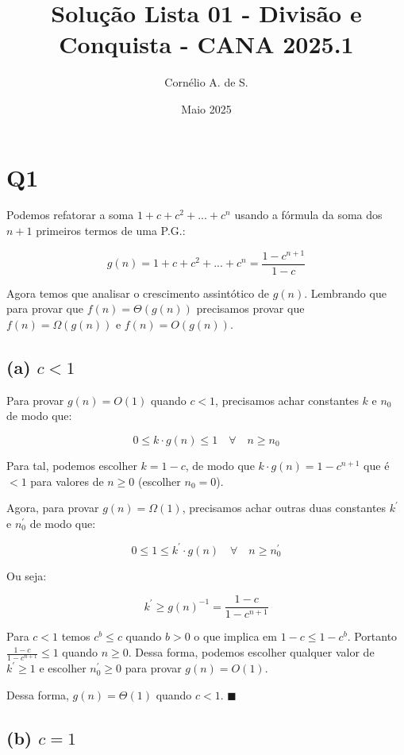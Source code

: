 \documentclass[12pt, a4paper]{article}
\title{Solução Lista 01 - Divisão e Conquista - CANA 2025.1}
\author{Cornélio A. de S.}
\date{Maio 2025}
\begin{document}
\maketitle




\section*{Q1}

Podemos refatorar a soma $1+c+c^2+...+c^n$ usando a fórmula da soma dos $n+1$ primeiros termos de uma P.G.:

\[ g(n) = 1+c+c^2+...+c^n = \frac{1-c^{n+1}}{1-c} \]

Agora temos que analisar o crescimento assintótico de $g(n)$. Lembrando que para provar que $f(n)=\Theta(g(n))$ precisamos provar que $f(n)=\Omega(g(n))$ e $f(n)=O(g(n))$.

\subsection*{(a) $c<1$}

Para provar $g(n) = O(1)$ quando $c<1$, precisamos achar constantes $k$ e $n_0$ de modo que:

\[ 0 \leq k \cdot g(n) \leq 1 \quad \forall \quad n \geq n_0 \]

Para tal, podemos escolher $k=1-c$, de modo que $k \cdot g(n) = 1-c^{n+1}$ que é $< 1$ para valores de $n \geq 0$ (escolher $n_0 = 0$).

Agora, para provar $g(n) = \Omega(1)$, precisamos achar outras duas constantes $k^{'}$ e $n^{'}_{0}$ de modo que:

\[ 0 \leq 1 \leq k^{'} \cdot g(n) \quad \forall \quad n \geq n^{'}_{0} \]

Ou seja:

\[ k^{'} \geq g(n)^{-1} = \frac{1-c}{1-c^{n+1}} \]

Para $c<1$ temos $c^b \leq c$ quando $b>0$ o que implica em $1-c \leq 1-c^b$. Portanto $\frac{1-c}{1-c^{n+1}} \leq 1$ quando $n \geq 0$. Dessa forma, podemos escolher qualquer valor de $k^{'} \geq 1$ e escolher $n^{'}_{0} \geq 0$ para provar $g(n) = O(1)$.


Dessa forma, $g(n)=\Theta(1)$ quando $c < 1$. $\blacksquare$

\subsection*{(b) $c=1$}
\end{document}
